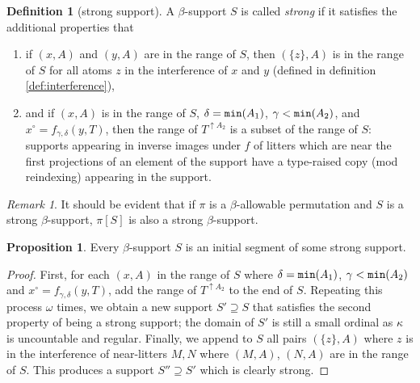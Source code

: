 \documentclass{article}
\theoremstyle{definition}
\newtheorem{proposition}[theorem]{Proposition}
\newtheorem{definition}[theorem]{Definition}
\theoremstyle{remark}
\newtheorem{remark}[theorem]{Remark}
\begin{document}
{\begin{definition}[strong support]\label{def:strong_support}
A $\beta$-support $S$ is called {\em strong\/}
if it satisfies the additional properties that

\begin{enumerate}

\item if $(x,A)$ and $(y,A)$ are in the range of $S$, then $(\{z\},A)$ is in the range of $S$ for all atoms $z$ in the interference of $x$ and $y$ (defined in definition \ref{def:interference}),

\item and if $(x,A)$ is in the range of $S$, $\delta={\tt min}(A_1)$, $\gamma<{\tt min}(A_2)$, and $x^\circ = f_{\gamma,\delta}(y,T)$, then the range of $T^{\uparrow A_2}$ is a subset of the range of $S$:  supports appearing in inverse images under $f$ of litters which are near the first projections of an element of the support have a type-raised copy (mod reindexing) appearing in the support.
\end{enumerate}
\end{definition}


\begin{remark}
It should be evident that if $\pi$ is a $\beta$-allowable permutation and $S$ is a strong $\beta$-support,
$\pi[S]$ is also a strong $\beta$-support.
\end{remark}

\begin{proposition}\label{prop:extend_to_strong_support}
Every $\beta$-support $S$ is an initial segment of some strong support.
\end{proposition}
\begin{proof}
First, for each $(x,A)$ in the range of $S$ where $\delta={\tt min}(A_1)$, $\gamma<{\tt min}(A_2)$ and $x^\circ = f_{\gamma,\delta}(y,T)$, add the range of $T^{\uparrow A_2}$ to the end of $S$.
Repeating this process $\omega$ times, we obtain a new support $S' \supseteq S$ that satisfies the second property of being a strong support; the domain of $S'$ is still a small ordinal as $\kappa$ is uncountable and regular.
Finally, we append to $S$ all pairs $(\{z\},A)$ where $z$ is in the interference of near-litters $M,N$ where $(M,A)$, $(N,A)$ are in the range of $S$.
This produces a support $S'' \supseteq S'$ which is clearly strong.
\end{proof}

}
\end{document}
